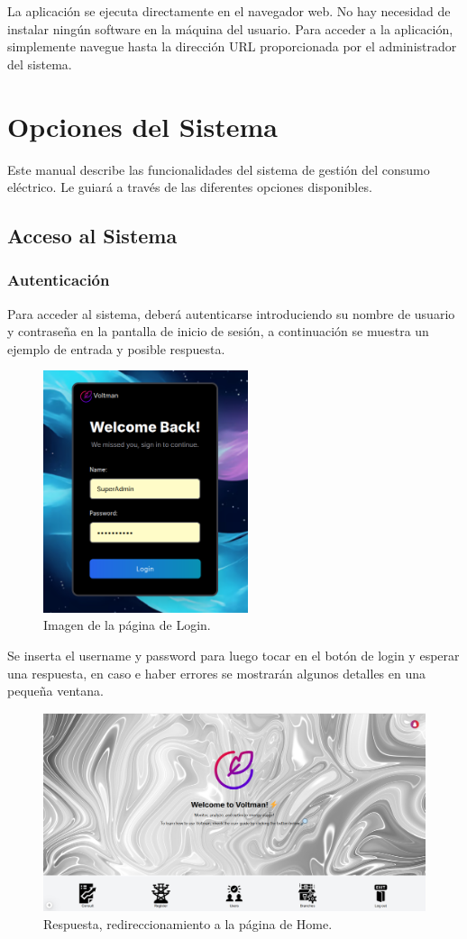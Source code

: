 \documentclass{article}
\begin{document}
La aplicación se ejecuta directamente en el navegador web. No hay necesidad de instalar ningún software en la máquina del usuario.  Para acceder a la aplicación, simplemente navegue hasta la dirección URL proporcionada por el administrador del sistema.


\section{Opciones del Sistema}
Este manual describe las funcionalidades del sistema de gestión del consumo eléctrico.  Le guiará a través de las diferentes opciones disponibles.

\subsection{Acceso al Sistema}

\subsubsection{Autenticación}
Para acceder al sistema, deberá autenticarse introduciendo su nombre de usuario y contraseña en la pantalla de inicio de sesión, a continuación se muestra un ejemplo de entrada y posible respuesta.

\begin{figure}[h!]
    \centering
    \includegraphics[width= 6cm]{login_page.png}
    \caption{Imagen de la página de Login.}
\end{figure}

Se inserta el username y password para luego tocar en el botón de login y esperar una respuesta, en caso e haber errores se mostrarán algunos detalles en una pequeña ventana.

\begin{figure}[h!]
    \centering
    \includegraphics[width= 12cm]{home_page.png}
    \caption{Respuesta, redireccionamiento a la página de Home.}
\end{figure}
\end{document}
